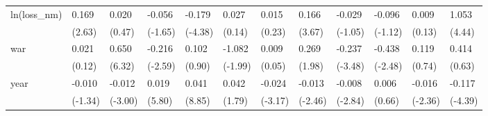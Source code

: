 \begin{tabular}{p{1.5cm} p{2cm} p{1.7cm} p{1.7cm} p{1.7cm} p{1.7cm} p{1.7cm} p{1.7cm} p{1.7cm} p{1.7cm} p{1.7cm} p{1.7cm}}
\hline
ln(loss\_nm)     &    0.169\sym{*}  &    0.020         &   -0.056         &   -0.179\sym{**} &    0.027         &    0.015         &    0.166\sym{**} &   -0.029         &   -0.096         &    0.009         &    1.053\sym{**} \\
                &   (2.63)         &   (0.47)         &  (-1.65)         &  (-4.38)         &   (0.14)         &   (0.23)         &   (3.67)         &  (-1.05)         &  (-1.12)         &   (0.13)         &   (4.44)         \\
war             &    0.021         &    0.650\sym{***}&   -0.216\sym{*}  &    0.102         &   -1.082         &    0.009         &    0.269         &   -0.237\sym{**} &   -0.438\sym{*}  &    0.119         &    0.414         \\
                &   (0.12)         &   (6.32)         &  (-2.59)         &   (0.90)         &  (-1.99)         &   (0.05)         &   (1.98)         &  (-3.48)         &  (-2.48)         &   (0.74)         &   (0.63)         \\
year            &   -0.010         &   -0.012\sym{**} &    0.019\sym{***}&    0.041\sym{***}&    0.042         &   -0.024\sym{*}  &   -0.013\sym{*}  &   -0.008\sym{**} &    0.006         &   -0.016\sym{*}  &   -0.117\sym{**} \\
                &  (-1.34)         &  (-3.00)         &   (5.80)         &   (8.85)         &   (1.79)         &  (-3.17)         &  (-2.46)         &  (-2.84)         &   (0.66)         &  (-2.36)         &  (-4.39)         \\
\end{tabular}
